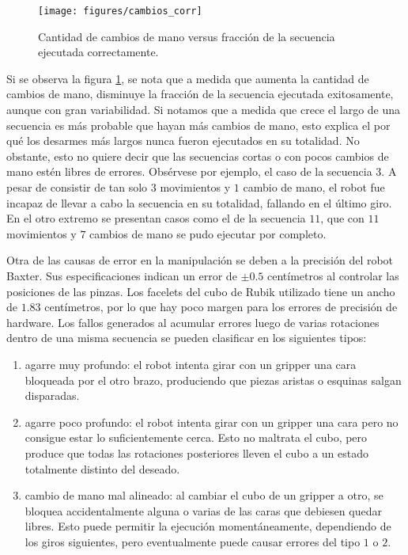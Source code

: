\begin{figure}[h!]
	\centering
	\texttt{[image: figures/cambios\_corr]}
	\caption{Cantidad de cambios de mano versus fracción de la secuencia ejecutada correctamente.}
	\label{corr}
\end{figure}
Si se observa la figura \ref{corr}, se nota que a medida que aumenta la cantidad de cambios de mano, disminuye la fracción de la secuencia ejecutada exitosamente, aunque con gran variabilidad. Si notamos que a medida que crece el largo de una secuencia es más probable que hayan más cambios de mano, esto explica el por qué los desarmes más largos nunca fueron ejecutados en su totalidad. No obstante, esto no quiere decir que las secuencias cortas o con pocos cambios de mano estén libres de errores. Obsérvese por ejemplo, el caso de la secuencia $3$. A pesar de consistir de tan solo $3$ movimientos y $1$ cambio de mano, el robot fue incapaz de llevar a cabo la secuencia en su totalidad, fallando en el último giro. En el otro extremo se presentan casos como el de la secuencia $11$, que con $11$ movimientos y $7$ cambios de mano se pudo ejecutar por completo.

Otra de las causas de error en la manipulación se deben a la precisión del robot Baxter. Sus especificaciones indican un error de $\pm 0.5$ centímetros al controlar las posiciones de las pinzas. Los facelets del cubo de Rubik utilizado tiene un ancho de $1.83$ centímetros, por lo que hay poco margen para los errores de precisión de hardware. Los fallos generados al acumular errores luego de varias rotaciones dentro de una misma secuencia se pueden clasificar en los siguientes tipos:
\begin{enumerate}
	\item agarre muy profundo: el robot intenta girar con un gripper una cara bloqueada por el otro brazo, produciendo que piezas aristas o esquinas salgan disparadas.
	\item agarre poco profundo: el robot intenta girar con un gripper una cara pero no consigue estar lo suficientemente cerca. Esto no maltrata el cubo, pero produce que todas las rotaciones posteriores lleven el cubo a un estado totalmente distinto del deseado.
	\item cambio de mano mal alineado: al cambiar el cubo de un gripper a otro, se bloquea accidentalmente alguna o varias de las caras que debiesen quedar libres. Esto puede permitir la ejecución momentáneamente, dependiendo de los giros siguientes, pero eventualmente puede causar errores del tipo $1$ o $2$.
\end{enumerate}

